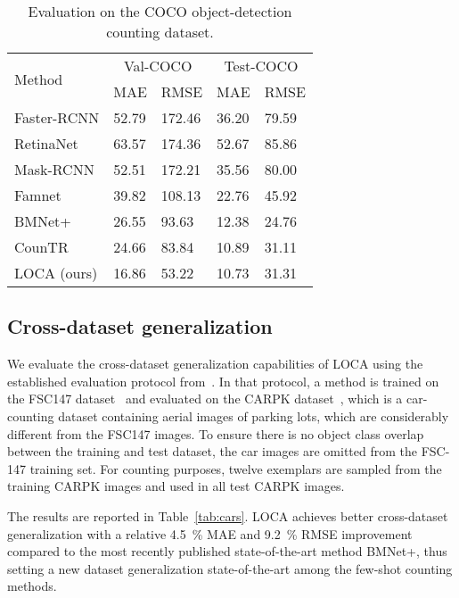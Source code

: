 \documentclass[10pt,twocolumn,letterpaper]{article}
\newcommand*\circledd[1]{\tikz[baseline=(char.base)]{
            \node[shape=circle,draw,inner sep=0.15pt] (char) {#1};}}
\newcommand{\first}[1]{{#1\raisebox{0.8pt}{\footnotesize \color{gold} \circledd{1}}}}
\newcommand{\second}[1]{{#1\raisebox{0.8pt}{\footnotesize \color{silver} \circledd{2}}}}
\newcommand{\third}[1]{{#1\raisebox{0.8pt}{\footnotesize \color{bronze} \circledd{3}}}}
\begin{document}
\begin{table}[htbp]
    \centering
    \begin{tabular}{l l l l l}\toprule
        \multirow{2}{*}{Method}& \multicolumn{2}{c}{Val-COCO} & \multicolumn{2}{c}{Test-COCO} \\
        & MAE & RMSE & MAE & RMSE \\ 
        \midrule
        Faster-RCNN \cite{fasterrcnn} & 52.79 & 172.46 & 36.20 & 79.59 \\
        RetinaNet \cite{retinanet} & 63.57 & 174.36 & 52.67 & 85.86 \\
        Mask-RCNN \cite{maskrcnn} & 52.51 & 172.21 & 35.56 & 80.00 \\
        Famnet \cite{famnet} & 39.82 & 108.13 & 22.76 & 45.92 \\
        BMNet+ \cite{bmnet} & \third{26.55} & \third{93.63} & \third{12.38} & \first{24.76} \\
        CounTR \cite{countr} & \second{24.66} & \second{83.84} & \second{10.89} & \second{31.11} \\
        LOCA (ours) & \first{16.86} & \first{53.22} & \first{10.73} & \third{31.31} \\
        \bottomrule
    \end{tabular}
    \caption{Evaluation on the COCO object-detection counting dataset.}
    \label{tab:results_coco}
\end{table}


\subsection{Cross-dataset generalization}
\label{sec:cross_dataset}

We evaluate the cross-dataset generalization capabilities of LOCA using the established evaluation protocol from~\cite{famnet}. In that protocol, a method is trained on the FSC147 dataset~\cite{famnet} and evaluated on the CARPK dataset~\cite{carpk}, which is a car-counting dataset containing aerial images of parking lots, which are considerably different from the FSC147 images. To ensure there is no object class overlap between the training and test dataset, the car images are omitted from the FSC-147 training set. For counting purposes, twelve exemplars are sampled from the training CARPK images and used in all test CARPK images. 



The results are reported in Table~\ref{tab:cars}. LOCA achieves better cross-dataset generalization with a relative  4.5~\% MAE and 9.2~\% RMSE improvement compared to the most recently published state-of-the-art method BMNet+, thus setting a new dataset generalization state-of-the-art among the few-shot counting methods.
\end{document}
